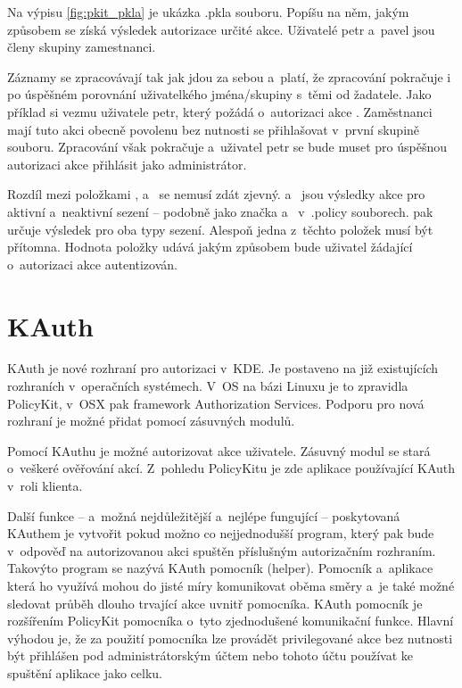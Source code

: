Na výpisu \ref{fig:pkit_pkla} je ukázka .pkla souboru. Popíšu na něm, jakým způsobem se získá výsledek autorizace určité akce. Uživatelé petr a~pavel jsou členy skupiny zamestnanci.

Záznamy se zpracovávají tak jak jdou za sebou a~platí, že zpracování pokračuje i po úspěšném porovnání uživatelkého jména/skupiny s~těmi od žadatele. Jako příklad si vezmu uživatele petr, který požádá o~autorizaci akce . Zaměstnanci mají tuto akci obecně povolenu bez nutnosti se přihlašovat v~první skupině souboru. Zpracování však pokračuje a~uživatel petr se bude muset pro úspěšnou autorizaci akce přihlásit jako administrátor.

Rozdíl mezi položkami ,  a~ se nemusí zdát zjevný.  a~ jsou výsledky akce pro aktivní a~neaktivní sezení -- podobně jako značka  a~ v~.policy souborech.  pak určuje výsledek pro oba typy sezení. Alespoň jedna z~těchto položek musí být přítomna. Hodnota položky udává jakým způsobem bude uživatel žádající o~autorizaci akce autentizován.

\section{KAuth}
KAuth je nové rozhraní pro autorizaci v~KDE. Je postaveno na již existujících rozhraních v~operačních systémech. V~OS na bázi Linuxu je to zpravidla PolicyKit, v~OSX pak framework Authorization Services. Podporu pro nová rozhraní je možné přidat pomocí zásuvných modulů.

Pomocí KAuthu je možné autorizovat akce uživatele. Zásuvný modul se stará o~veškeré ověřování akcí. Z~pohledu PolicyKitu je zde aplikace používající KAuth v~roli klienta.

Další funkce -- a~možná nejdůležitější a~nejlépe fungující -- poskytovaná KAuthem je vytvořit pokud možno co nejjednodušší program, který pak bude v~odpověď na autorizovanou akci spuštěn příslušným autorizačním rozhraním. Takovýto program se nazývá KAuth pomocník (helper). Pomocník a~aplikace která ho využívá mohou do jisté míry komunikovat oběma směry a~je také možné sledovat průběh dlouho trvající akce uvnitř pomocníka. KAuth pomocník je rozšířením PolicyKit pomocníka o~tyto zjednodušené komunikační funkce. Hlavní výhodou je, že za použití pomocníka lze provádět privilegované akce bez nutnosti být přihlášen pod administrátorským účtem nebo tohoto účtu používat ke spuštění aplikace jako celku.

